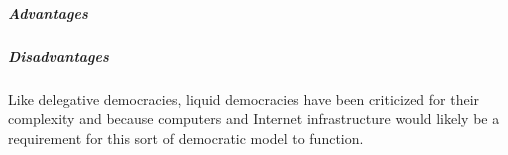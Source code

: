 
\subparagraph{Advantages}

\subparagraph{Disadvantages}
Like delegative democracies, liquid democracies have been criticized for their
complexity and because computers and Internet infrastructure would likely be a
requirement for this sort of democratic model to function.





